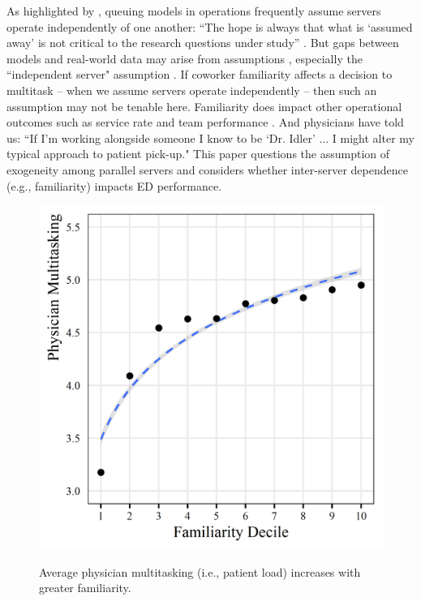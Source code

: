  As highlighted by \cite{Boudreau2003}, queuing models in operations frequently assume servers operate independently of one another: “The hope is always that what is ‘assumed away’ is not critical to the research questions under study” \citep[p. 740]{Bendoly2006}. But gaps between models and real-world data \citep[e.g.,][]{Ouyang2021} may arise from assumptions \citep{Bendoly2010}, especially the “independent server" assumption \citep{Schultz1997}. If coworker familiarity affects a decision to multitask -- when we assume servers operate independently -- then such an assumption may not be tenable here. Familiarity does impact other operational outcomes such as service rate \citep[e.g.,][]{Reagans2005} and team performance \citep[e.g.,][]{Huckman2011}. And physicians have told us: “If I'm working alongside someone I know to be `Dr. Idler' ... I might alter my typical approach to patient pick-up." This paper questions the assumption of exogeneity among parallel servers and considers whether inter-server dependence (e.g., familiarity) impacts ED performance.

\begin{figure}[!b]
     \centering
     \caption{Average physician multitasking (i.e., patient load) increases with greater familiarity.} \medskip
     \includegraphics[scale=1]{Figures/PU/Load v. Fam (Xtile).png}     
     \label{fig:load_fam}
 \end{figure}


